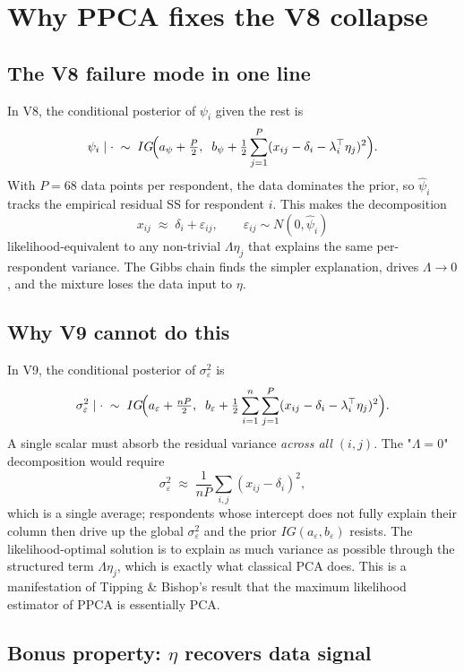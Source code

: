\documentclass[11pt]{article}
\begin{document}
\section{Why PPCA fixes the V8 collapse}

\subsection{The V8 failure mode in one line}

In V8, the conditional posterior of $\psi_i$ given the rest is
\[
\psi_i \mid \cdot \;\sim\; IG\!\Bigl(a_\psi+\tfrac{P}{2},\;\;b_\psi+\tfrac{1}{2}\sum_{j=1}^P(x_{ij}-\delta_i-\lambda_i^\top\eta_j)^2\Bigr).
\]
With $P=68$ data points per respondent, the data dominates the prior, so
$\hat\psi_i$ tracks the empirical residual SS for respondent $i$.
This makes the decomposition
\[
x_{ij}\;\approx\;\delta_i + \varepsilon_{ij},\qquad \varepsilon_{ij}\sim N(0,\hat\psi_i)
\]
likelihood-equivalent to any non-trivial $\Lambda\eta_j$ that explains the
same per-respondent variance.
The Gibbs chain finds the simpler explanation, drives $\Lambda\to 0$, and
the mixture loses the data input to $\eta$.

\subsection{Why V9 cannot do this}

In V9, the conditional posterior of $\sigma_\varepsilon^2$ is
\[
\sigma_\varepsilon^2 \mid \cdot \;\sim\; IG\!\Bigl(a_\varepsilon+\tfrac{nP}{2},\;\;b_\varepsilon+\tfrac{1}{2}\sum_{i=1}^n\sum_{j=1}^P(x_{ij}-\delta_i-\lambda_i^\top\eta_j)^2\Bigr).
\]
A single scalar must absorb the residual variance \emph{across all $(i,j)$}.
The "$\Lambda=0$" decomposition would require
\[
\sigma_\varepsilon^2 \;\approx\; \frac{1}{nP}\sum_{i,j}(x_{ij}-\delta_i)^2,
\]
which is a single average; respondents whose intercept does not fully
explain their column then drive up the global $\sigma_\varepsilon^2$
and the prior $IG(a_\varepsilon,b_\varepsilon)$ resists.
The likelihood-optimal solution is to explain as much variance as possible
through the structured term $\Lambda\eta_j$, which is exactly what
classical PCA does.
This is a manifestation of Tipping \& Bishop's result that the maximum
likelihood estimator of PPCA is essentially PCA.

\subsection{Bonus property: $\eta$ recovers data signal}
\end{document}
